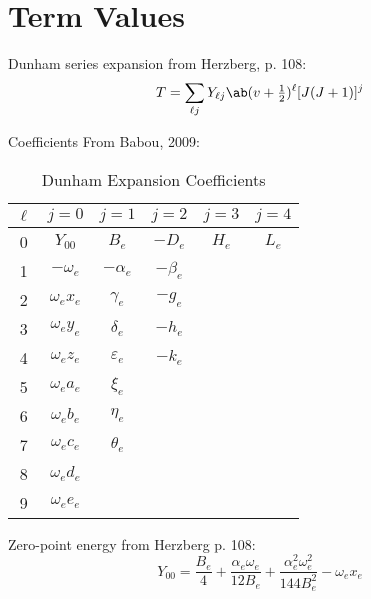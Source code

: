 \documentclass[11pt, twoside, fleqn]{report}
\begin{document}
\section{Term Values}

Dunham series expansion from Herzberg, p. 108:
\begin{equation*}
    T = \sum_{\ell j}Y_{\ell j}\ab(v + \tfrac{1}{2})^\ell [J(J + 1)]^{j}
\end{equation*}

Coefficients From Babou, 2009:
\begin{table}[H]
    \centering
    \caption{Dunham Expansion Coefficients}
    \begin{tabular}{c|ccccc}
        \toprule
        $\ell$ & $j = 0$           & $j = 1$           & $j = 2$      & $j = 3$ & $j = 4$ \\
        \midrule
        0      & $Y_{00}$          & $B_{e}$           & $-D_{e}$     & $H_{e}$ & $L_{e}$ \\
        1      & $-\omega_{e}$     & $-\alpha_{e}$     & $-\beta_{e}$ &         &         \\
        2      & $\omega_{e}x_{e}$ & $\gamma_{e}$      & $-g_{e}$     &         &         \\
        3      & $\omega_{e}y_{e}$ & $\delta_{e}$      & $-h_{e}$     &         &         \\
        4      & $\omega_{e}z_{e}$ & $\varepsilon_{e}$ & $-k_{e}$     &         &         \\
        5      & $\omega_{e}a_{e}$ & $\xi_{e}$         &              &         &         \\
        6      & $\omega_{e}b_{e}$ & $\eta_{e}$        &              &         &         \\
        7      & $\omega_{e}c_{e}$ & $\theta_{e}$      &              &         &         \\
        8      & $\omega_{e}d_{e}$ &                   &              &         &         \\
        9      & $\omega_{e}e_{e}$ &                   &              &         &         \\
        \bottomrule
    \end{tabular}
\end{table}

Zero-point energy from Herzberg p. 108:
\begin{equation*}
    Y_{00} = \frac{B_{e}}{4} + \frac{\alpha_{e}\omega_{e}}{12B_{e}} + \frac{\alpha_{e}^{2}\omega_{e}^{2}}{144B_{e}^{2}} - \omega_{e}x_{e}
\end{equation*}
\end{document}
